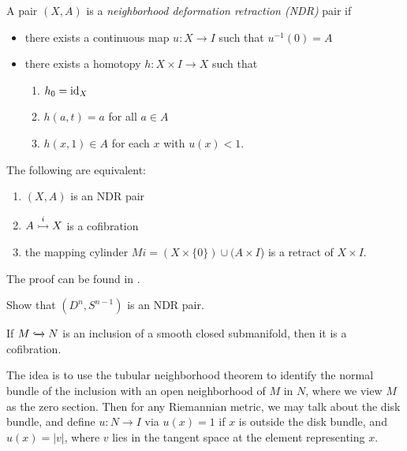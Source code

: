 \documentclass{article}[11pt]
\begin{document}
\begin{definition} A pair $(X,A)$ is a \textit{neighborhood deformation retraction (NDR)} pair if
\vspace{-10pt}
\begin{itemize}\itemsep0em
	\item there exists a continuous map $u : X\to I$ such that $u^{-1}(0) = A$
	\item there exists a homotopy $h : X \times I \to X$ such that
	\begin{enumerate}\itemsep0em
	\vspace{-5pt}
		\item $h_0 = \text{id}_X$
		\item $h(a, t) = a$ for all $a\in A$
		\item $h(x,1) \in A$ for each $x$ with $u(x) < 1$.
	\end{enumerate}
\end{itemize}
\end{definition}

\begin{proposition} The following are equivalent:
\vspace{-10pt}
\begin{enumerate}\itemsep0em
	\item $(X,A)$ is an NDR pair
	\item $A\overset{i}{\rightarrowtail} X$ is a cofibration
	\item the mapping cylinder $Mi = (X\times\{0\}) \cup (A\times I$) is a retract of $X \times I$.
\end{enumerate}
\end{proposition}
The proof can be found in \cite[VI, Section 4]{may}.

\begin{exercise} Show that $(D^n, S^{n-1})$ is an NDR pair.
\end{exercise}

\begin{exercise} If $M\xhookrightarrow{} N$ is an inclusion of a smooth closed submanifold, then it is a cofibration.

The idea is to use the tubular neighborhood theorem to identify the normal bundle of the inclusion with an open neighborhood of $M$ in $N$, where we view $M$ as the zero section. Then for any Riemannian metric, we may talk about the disk bundle, and define $u: N \to I$ via $u(x) = 1$ if $x$ is outside the disk bundle, and $u(x) =|v|$, where $v$ lies in the tangent space at the element representing $x$.
\end{exercise}
\end{document}
